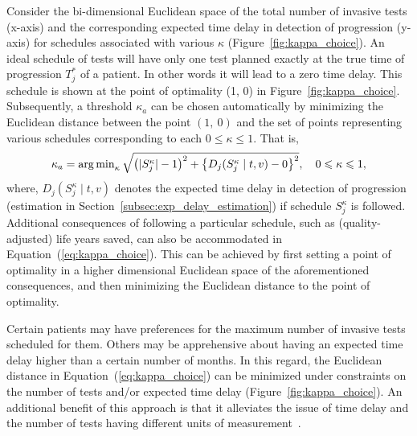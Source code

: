 Consider the bi-dimensional Euclidean space of the total number of invasive tests (x-axis) and the corresponding expected time delay in detection of progression (y-axis) for schedules associated with various $\kappa$ (Figure~\ref{fig:kappa_choice}). An ideal schedule of tests will have only one test planned exactly at the true time of progression $T^*_j$ of a patient. In other words it will lead to a zero time delay. This schedule is shown at the point of optimality (1, 0) in Figure~\ref{fig:kappa_choice}. Subsequently, a threshold $\kappa_a$ can be chosen automatically by minimizing the Euclidean distance between the point $(1,~0)$ and the set of points representing various schedules corresponding to each $0 \leq \kappa \leq 1$. That is,
\begin{equation}
\label{eq:kappa_choice}
\kappa_a = \argmin_{\kappa} \sqrt{\big(\vert S_j^\kappa \vert - 1\big)^2 + \big\{D_j(S_j^{\kappa} \mid t, v) - 0\big\}^2} , \quad 0 \leq \kappa \leq 1,
\end{equation}
where, $D_j(S_j^{\kappa} \mid t, v)$ denotes the expected time delay in detection of progression (estimation in Section~\ref{subsec:exp_delay_estimation}) if schedule $S_j^{\kappa}$ is followed. Additional consequences of following a particular schedule, such as (quality-adjusted) life years saved, can also be accommodated in Equation~(\ref{eq:kappa_choice}). This can be achieved by first setting a point of optimality in a higher dimensional Euclidean space of the aforementioned consequences, and then minimizing the Euclidean distance to the point of optimality.

Certain patients may have preferences for the maximum number of invasive tests scheduled for them. Others may be apprehensive about having an expected time delay higher than a certain number of months. In this regard, the Euclidean distance in Equation~(\ref{eq:kappa_choice}) can be minimized under constraints on the number of tests and/or expected time delay (Figure~\ref{fig:kappa_choice}). An additional benefit of this approach is that it alleviates the issue of time delay and the number of tests having different units of measurement~\citep{cook1994equivalence}.

